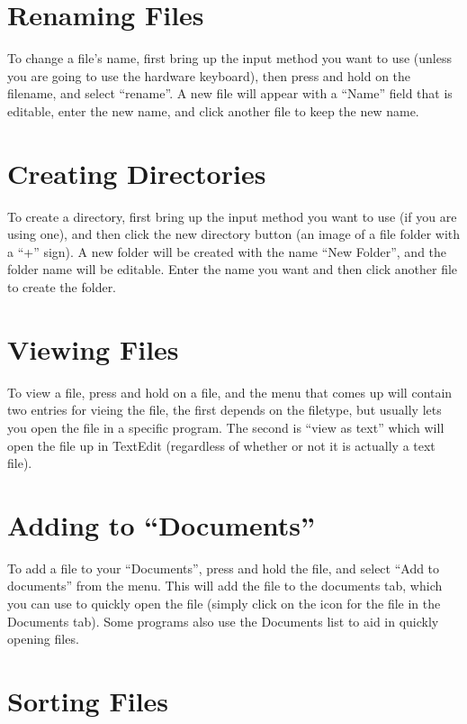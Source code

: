 \documentclass[12pt,letterpaper,oneside, openany]{book} \usepackage[latin1] {inputenc}
\begin{document}
\section{Renaming Files}

To change a file's name, first bring up the input method you want to use (unless you are going to use the hardware keyboard), then press and hold on the filename, and select ``rename''. A new file will appear with a ``Name'' field that is editable, enter the new name, and click another file to keep the new name. 

\section{Creating Directories}

To create a directory, first bring up the input method you want to use (if you are using one), and then click the new directory button (an image of a file folder with a ``+'' sign). A new folder will be created with the name ``New Folder'', and the folder name will be editable. Enter the name you want and then click another file to create the folder. 

\section{Viewing Files}

To view a file, press and hold on a file, and the menu that comes up will contain two entries for vieing the file, the first depends on the filetype, but usually lets you open the file in a specific program. The second is ``view as text'' which will open the file up in TextEdit (regardless of whether or not it is actually a text file). 

\section{Adding to ``Documents''}
\label{docadd}
To add a file to your ``Documents'', press and hold the file, and select ``Add to documents'' from the menu. This will add the file to the documents tab, which you can use to quickly open the file (simply click on the icon for the file in the Documents tab). Some programs also use the Documents list to aid in quickly opening files. 

\section{Sorting Files}
\end{document}
